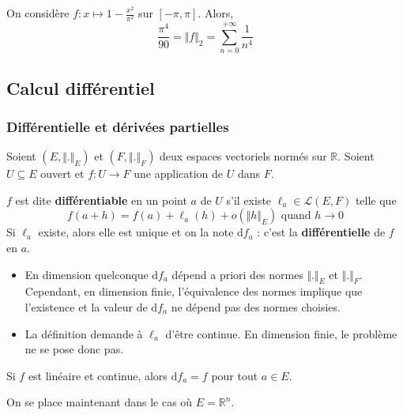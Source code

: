   \begin{example}
    On considère $f : x \mapsto 1 - \frac{x^2}{\pi^2}$ sur $[-\pi, \pi]$. Alors,
    \[ \frac{\pi^4}{90} = \Vert f \Vert_2 = \sum_{n=0}^{+\infty} \frac{1}{n^4} \]
  \end{example}

  \subsection{Calcul différentiel}

  \subsubsection{Différentielle et dérivées partielles}


  Soient $(E, \Vert . \Vert_E)$ et $(F, \Vert . \Vert_F)$ deux espaces vectoriels normés sur $\mathbb{R}$. Soient $U \subseteq E$ ouvert et $f : U \rightarrow F$ une application de $U$ dans $F$.

  \begin{definition}
    $f$ est dite \textbf{différentiable} en un point $a$ de $U$ s'il existe $\ell_a \in \mathcal{L}(E,F)$ telle que
    \[ f(a+h) = f(a) + \ell_a(h) + o(\Vert h \Vert_E) \text{ quand } h \longrightarrow 0 \]
    Si $\ell_a$ existe, alors elle est unique et on la note $\mathrm{d}f_a$ : c'est la \textbf{différentielle} de $f$ en $a$.
  \end{definition}

  \begin{remark}
    \begin{itemize}
      \item En dimension quelconque $\mathrm{d}f_a$ dépend a priori des normes $\Vert . \Vert_E$ et $\Vert . \Vert_F$. Cependant, en dimension finie, l'équivalence des normes implique que l'existence et la valeur de $\mathrm{d}f_a$ ne dépend pas des normes choisies.
      \item La définition demande à $\ell_a$ d'être continue. En dimension finie, le problème ne se pose donc pas.
    \end{itemize}
  \end{remark}

  \begin{example}
    Si $f$ est linéaire et continue, alors $\mathrm{d}f_a = f$ pour tout $a \in E$.
  \end{example}

  On se place maintenant dans le cas où $E = \mathbb{R}^n$.

